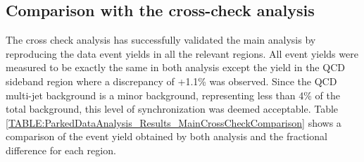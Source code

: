 
\clearpage

\subsection{Comparison with the cross-check analysis}


The cross check analysis has successfully validated the main analysis by reproducing the data event yields in all the relevant regions. All event yields were measured to be exactly the same in both analysis except the yield in the \gls{QCD} sideband region where a discrepancy of +1.1\% was observed. Since the \gls{QCD} multi-jet background is a minor background, representing less than 4\% of the total background, this level of synchronization was deemed acceptable. Table \ref{TABLE:ParkedDataAnalysis_Results_MainCrossCheckComparison} shows a comparison of the event yield obtained by both analysis and the fractional difference for each region.

